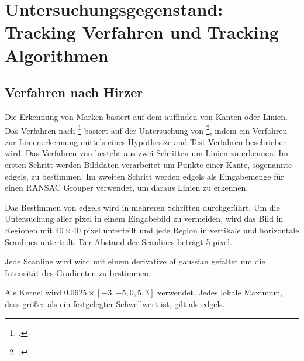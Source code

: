 \section{Untersuchungsgegenstand: Tracking Verfahren und Tracking Algorithmen} %
\label{sec:untersuchungsgegenstand}
\begin{comment}
	Untersuchungsgegenstand: Verfahren und Algorithmen präzise vorstellen und ihre Unterschiede hervorheben.
	Notwendige Kriterien der Algorithmen bestimmen

	Grober Ablauf der Verfahren:
	* Wer hats erfunden?
	* Wie ist das Verfahren aufgebaut (Algo in grob)
	* Welche Kriterien müssen erfüllt sein (monochrome, rgb eingabe)?
\end{comment}

\subsection{Verfahren nach Hirzer} %
\label{sub:verfahren_nach_hirzer}

Die Erkennung von Marken basiert auf dem auffinden von Kanten oder Linien. Das Verfahren nach \citeauthor{hirzer08}\footcite{hirzer08} basiert auf der Untersuchung von \citeauthor{clarke96}\footcite{clarke96}, indem ein Verfahren zur Linienerkennung mittels eines Hypothesize and Test Verfahren beschrieben wird. Das Verfahren von \citeauthor{clarke96} besteht aus zwei Schritten um Linien zu erkennen. Im ersten Schritt werden Bilddaten verarbeitet um Punkte einer Kante, sogenannte \gls{edgels}, zu bestimmen. Im zweiten Schritt werden \gls{edgels} als Eingabemenge für einen RANSAC Grouper verwendet, um daraus Linien zu erkennen.



Das Bestimmen von \gls{edgels} wird in mehreren Schritten durchgeführt. Um die Untersuchung aller \gls{pixel} in einem Eingabebild zu vermeiden, wird das Bild in Regionen mit $40 \times 40$ \gls{pixel} unterteilt und jede Region in vertikale und horizontale Scanlines unterteilt. Der Abstand der Scanlines beträgt 5 \gls{pixel}.

Jede Scanline wird wird mit einem derivative of gaussian gefaltet um die Intensität des Gradienten zu bestimmen.
\begin{comment}
	Ist Intensity Gradient = Intensität des Gradienten?
\end{comment}
Als Kernel wird $0.0625 \times \left[-3,-5,0,5,3\right]$ verwendet. Jedes lokale Maximum, dass größer als ein festgelegter Schwellwert ist, gilt als \gls{edgels}.

